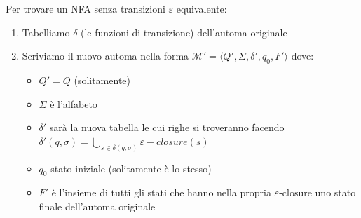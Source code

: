 \documentclass[12pt, a4paper]{report}
\begin{document}
                \begin{algorithm}
                    Per trovare un NFA senza transizioni $\varepsilon$ equivalente:
                    \begin{enumerate}
                        \item Tabelliamo $\delta$ (le funzioni di transizione) dell'automa originale
                        \item Scriviamo il nuovo automa nella forma $\mathcal{M'}=\langle Q',\Sigma,\delta',q_0,F'\rangle$ dove: \begin{itemize}
                            \item $Q'=Q$ (solitamente)
                            \item $\Sigma$ è l'alfabeto
                            \item $\delta'$ sarà la nuova tabella le cui righe si troveranno facendo $\delta'(q,\sigma)=\bigcup_{s\in\delta(q,\sigma)}\varepsilon-closure(s)$
                            \item $q_0$ stato iniziale (solitamente è lo stesso)
                            \item $F'$ è l'insieme di tutti gli stati che hanno nella propria $\varepsilon$-closure uno stato finale dell'automa originale
                        \end{itemize}
                    \end{enumerate}
                \end{algorithm}
\end{document}
